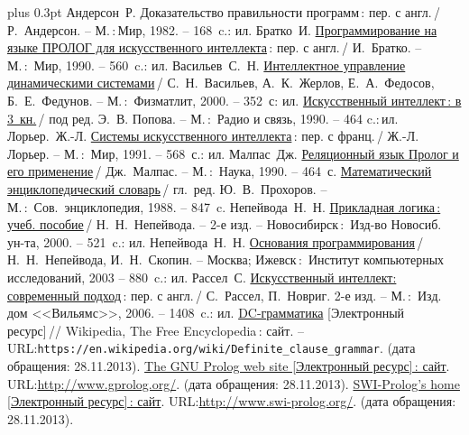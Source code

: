 \documentclass[14pt, openany, twoside, final]{extbook} %
\def\emphbib#1{#1}
\begin{document}
\begin{thebibliography}{99}\itemsep1pt \parskip 0pt plus 0.3pt
 Андерсон~Р. \emphbib{Доказательство правильности программ}\,{}: пер. с англ.\,{}/ Р.~Андерсон. -- М.\,:\,Мир, 1982. -- 168~c.: ил.
 Братко~И. \emphbib{\href{http://royallib.ru/book/bratko_ivan/programmirovanie_na_yazike_prolog_dlya_iskusstvennogo_intellekta.html}{Программирование на языке ПРОЛОГ для искусственного интеллекта}}\,{}: пер. с англ.\,/ И.~Братко. -- М.\,:~Мир, 1990. -- 560~c.: ил.
 Васильев~С.~Н. \emphbib{\href{http://bookfi.org/book/616050}{Интеллектное управление динамическими системами}}\,{}/ С.~Н.~Васильев, А.~К.~Жерлов, Е.~А.~Федосов, Б.~Е.~Федунов. -- М.\,:~Физматлит, 2000. -- 352~с: ил.
 \emphbib{\href{http://aihandbook.intsys.org.ru/index.php/intro/ai-handbook}{Искусственный интеллект\,{}: в 3~кн.}}\,{}/ под ред. Э.~В. Попова. -- М.\,:~Радио и связь, 1990. -- 464 c.:\,{}ил.
 Лорьер.~Ж.-Л.  \emphbib{\href{http://publ.lib.ru/ARCHIVES/L/LOR'ER_Jan_Lui/_Lor'er_J.L..html}{Системы искусственного интеллекта}\,{}: пер. с франц.}\,{}/ Ж.-Л. Лорьер. -- М.\,:~Мир, 1991. -- 568~с.: ил.
 Малпас~Дж. \emphbib{\href{http://padaread.com/?book=40731&pg=1}{Реляционный язык Пролог и его применение}}\,{}/ Дж.~Малпас. -- М.\,:~Наука, 1990. -- 464~с.
 \emphbib{\href{https://app.box.com/shared/793ukgvblxmj0hh6btw4}{Математический энциклопедический словарь}}\,{}/ гл.~ред. Ю.~В.~Прохоров. -- М.\,:~Сов.~энциклопедия, 1988. -- 847~c.
 Непейвода~Н.~Н. \emphbib{\href{http://www.logic-books.info/taxonomy/term/215}{Прикладная логика\,{}: учеб. пособие}}\,{}/ Н.~Н.~Непейвода. -- 2-е изд. -- Новосибирск\,{}:~Изд-во Новосиб. ун-та, 2000. -- 521~c.: ил.
 Непейвода~Н.~Н.  \emphbib{\href{http://philosophy.ru/library/logic_math/library/nepeivoda_prog.pdf}{Основания программирования}}\,{}/ Н.~Н.~Непейвода, И.~Н.~Скопин. -- Москва; Ижевск\,{}:~Институт компьютерных исследований, 2003 -- 880~c.: ил.
 Рассел~С. \href{http://www.aiportal.ru/downloads/books/ai-modern-approach-2-edition-by-rassel-norvig.html}{Искусственный интеллект: современный подход}\,{}: пер. с англ.\,{}/ С.~Рассел, П.~Новриг. 2-е изд. -- М.\,:~Изд. дом <<Вильямс>>, 2006. -- 1408~c.: ил.
 \emphbib{\href{https://en.wikipedia.org/wiki/Definite_clause_grammar}{DC-грамматика}} [Электронный ресурс]\,{}// Wikipedia, The Free Encyclopedia\,{}: сайт. -- URL:\texttt{https://en.wikipedia.org/wiki/Definite\_clause\linebreak\_grammar}. (дата обращения: 28.11.2013).
 \emphbib{\href{http://www.gprolog.org/}{The GNU Prolog web site [Электронный ресурс]\,{}: сайт}}. URL:\url{http://www.gprolog.org/}. (дата обращения: 28.11.2013).
 \emphbib{\href{http://www.swi-prolog.org/}{SWI-Prolog's home [Электронный ресурс]\,{}: сайт}}. URL:\url{http://www.swi-prolog.org/}. (дата обращения: 28.11.2013).
\end{thebibliography}
\label{lastpage}
\newpage
\thispagestyle{empty}
\mbox{}
\end{document}
